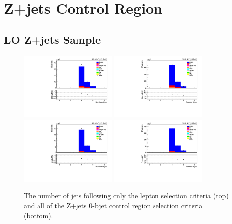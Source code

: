 \section{Z+jets Control Region}\label{appSec:zPlusControlRegionPlots}
\subsection{LO Z+jets Sample}

\begin{figure}[ht]
\centering
\includegraphics[width=0.42\textwidth]{figs/background-estimation/plots/unblinded/DY_control_old_prompt_ee_ttbarInc/numbJets_SingleTop_jetSel_ee.pdf}
\includegraphics[width=0.42\textwidth]{figs/background-estimation/plots/unblinded/DY_control_old_prompt_mumu_ttbarInc/numbJets_SingleTop_jetSel_mumu.pdf}
\\
\includegraphics[width=0.42\textwidth]{figs/background-estimation/plots/unblinded/DY_control_old_prompt_ee_ttbarInc/numbJets_SingleTop_wMass_ee.pdf}
\includegraphics[width=0.42\textwidth]{figs/background-estimation/plots/unblinded/DY_control_old_prompt_mumu_ttbarInc/numbJets_SingleTop_wMass_mumu.pdf}
\caption{
The number of jets following only the lepton selection criteria (top) and all of the Z+jets 0-bjet control region selection criteria (bottom).
}
\label{fig:CR_LO_nJets}
\end{figure}


